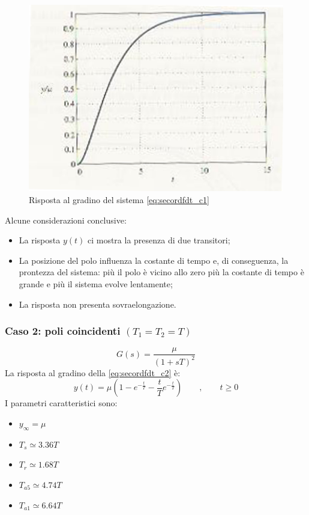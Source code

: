 \documentclass[a4paper]{report}
\begin{document}
\begin{figure}[!h]
  \begin{center}
    \includegraphics[scale=0.5]{./figures/rispscal2.png}
    \caption{Risposta al gradino del sistema \ref{eq:secordfdt_c1}}
    \label{fig:risp2}
  \end{center}
\end{figure} 

Alcune considerazioni conclusive:
\begin{itemize}
\item La risposta $y(t)$ ci mostra la presenza di due transitori;
\item La posizione del polo influenza la costante di tempo e, di
  conseguenza, la prontezza del sistema: pi\`u il polo \`e vicino allo
  zero pi\`u la costante di tempo \`e grande e pi\`u il sistema evolve
  lentamente;
\item La risposta non presenta sovraelongazione.
\end{itemize}

\subsubsection{Caso 2: poli coincidenti $(T_1 = T_2 = T)$}
\begin{equation}\label{eq:secordfdt_c2}
  G(s) = \dfrac{\mu}{(1 + sT)^2}
\end{equation}
La risposta al gradino della \ref{eq:secordfdt_c2} \`e:
\begin{equation}\label{eq:rispgradsec_c2}
  y(t) = \mu \left( 1 - e^{-\frac{t}{T}} -
  \dfrac{t}{T}e^{-\frac{t}{T}} \right)\qquad, \qquad t\ge 0
\end{equation}
I parametri caratteristici sono:
\begin{itemize}
\item $y_{\infty} = \mu$
\item $T_s \simeq 3.36T$
\item $T_r \simeq 1.68T$
\item $T_{a5} \simeq 4.74T$
\item $T_{a1} \simeq 6.64T$
\end{itemize}
\end{document}
